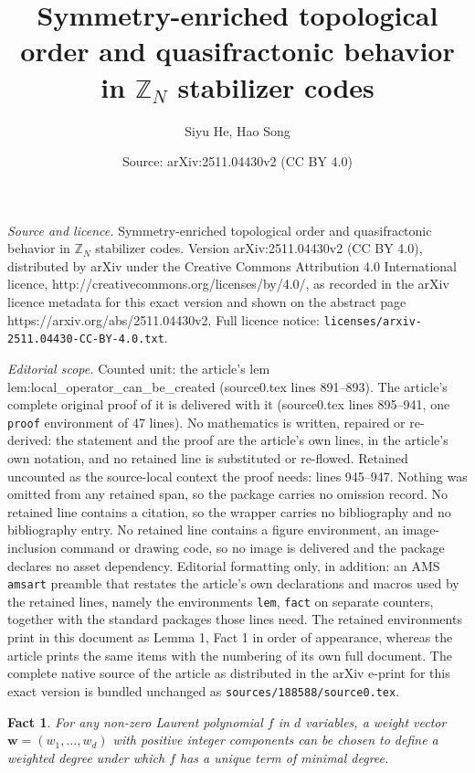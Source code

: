 \documentclass[10pt,a4paper]{amsart}
\title{Symmetry-enriched topological order and quasifractonic behavior in $\mathbb{Z}_N$ stabilizer codes}
\author{Siyu He, Hao Song}
\date{Source: arXiv:2511.04430v2 (CC BY 4.0)}
\newtheorem{fact}{Fact}
\begin{document}
\maketitle

\noindent\emph{Source and licence.} Symmetry-enriched topological order and quasifractonic behavior in $\mathbb{Z}_N$ stabilizer codes. Version arXiv:2511.04430v2 (CC BY 4.0), distributed by arXiv under the Creative Commons Attribution 4.0 International licence, http://creativecommons.org/licenses/by/4.0/, as recorded in the arXiv licence metadata for this exact version and shown on the abstract page https://arxiv.org/abs/2511.04430v2. Full licence notice: \texttt{licenses/arxiv-2511.04430-CC-BY-4.0.txt}.\par\smallskip

\noindent\textit{Editorial scope.} Counted unit: the article's lem lem:local\_operator\_can\_be\_created (source0.tex lines 891--893). The article's complete original proof of it is delivered with it (source0.tex lines 895--941, one \texttt{proof} environment of 47 lines). No mathematics is written, repaired or re-derived: the statement and the proof are the article's own lines, in the article's own notation, and no retained line is substituted or re-flowed.  Retained uncounted as the source-local context the proof needs: lines 945--947.  Nothing was omitted from any retained span, so the package carries no omission record.  No retained line contains a citation, so the wrapper carries no bibliography and no bibliography entry.  No retained line contains a figure environment, an image-inclusion command or drawing code, so no image is delivered and the package declares no asset dependency.  Editorial formatting only, in addition: an AMS \texttt{amsart} preamble that restates the article's own declarations and macros used by the retained lines, namely the environments \texttt{lem}, \texttt{fact} on separate counters, together with the standard packages those lines need.  The retained environments print in this document as Lemma 1, Fact 1 in order of appearance, whereas the article prints the same items with the numbering of its own full document.  The complete native source of the article as distributed in the arXiv e-print for this exact version is bundled unchanged as \texttt{sources/188588/source0.tex}.
\begin{fact} \label{fact1}
For any non-zero Laurent polynomial $f$ in $d$ variables, a weight vector $\mathbf{w}=(w_1, \dots, w_d)$ with positive integer components can be chosen to define a weighted degree under which $f$ has a unique term of minimal degree.
\end{fact}
\end{document}
